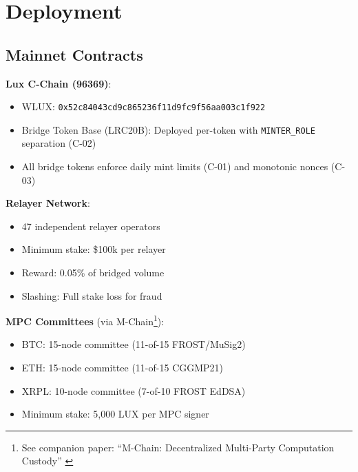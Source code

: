 \section{Deployment}


\subsection{Mainnet Contracts}

\textbf{Lux C-Chain (96369)}:
\begin{itemize}[leftmargin=1.1em]
  \item WLUX: \texttt{0x52c84043cd9c865236f11d9fc9f56aa003c1f922}
  \item Bridge Token Base (LRC20B): Deployed per-token with \texttt{MINTER\_ROLE} separation (C-02)
  \item All bridge tokens enforce daily mint limits (C-01) and monotonic nonces (C-03)
\end{itemize}

\textbf{Relayer Network}:
\begin{itemize}[leftmargin=1.1em]
  \item 47 independent relayer operators
  \item Minimum stake: \$100k per relayer
  \item Reward: 0.05\% of bridged volume
  \item Slashing: Full stake loss for fraud
\end{itemize}

\textbf{MPC Committees} (via M-Chain\footnote{See companion paper: ``M-Chain: Decentralized Multi-Party Computation Custody'' \cite{mchain}}):
\begin{itemize}[leftmargin=1.1em]
  \item BTC: 15-node committee (11-of-15 FROST/MuSig2)
  \item ETH: 15-node committee (11-of-15 CGGMP21)
  \item XRPL: 10-node committee (7-of-10 FROST EdDSA)
  \item Minimum stake: 5,000 LUX per MPC signer
\end{itemize}

